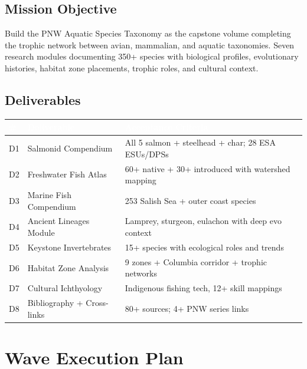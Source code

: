 \documentclass[11pt,letterpaper]{article}
\newcommand{\tableheader}[1]{\textbf{\sffamily\textcolor{white}{#1}}}
\begin{document}
\subsection{Mission Objective}
Build the PNW Aquatic Species Taxonomy as the capstone volume completing the trophic network between avian, mammalian, and aquatic taxonomies. Seven research modules documenting 350+ species with biological profiles, evolutionary histories, habitat zone placements, trophic roles, and cultural context.

\subsection{Deliverables}

\begin{center}
\begin{tabularx}{\textwidth}{C{0.5cm}L{3.5cm}X}
\toprule
{}
\tableheader{\#} & \tableheader{Deliverable} & \tableheader{Acceptance Criteria} \\
\midrule
D1 & Salmonid Compendium & All 5 salmon + steelhead + char; 28 ESA ESUs/DPSs \\
D2 & Freshwater Fish Atlas & 60+ native + 30+ introduced with watershed mapping \\
D3 & Marine Fish Compendium & 253 Salish Sea + outer coast species \\
D4 & Ancient Lineages Module & Lamprey, sturgeon, eulachon with deep evo context \\
D5 & Keystone Invertebrates & 15+ species with ecological roles and trends \\
D6 & Habitat Zone Analysis & 9 zones + Columbia corridor + trophic networks \\
D7 & Cultural Ichthyology & Indigenous fishing tech, 12+ skill mappings \\
D8 & Bibliography + Cross-links & 80+ sources; 4+ PNW series links \\
\bottomrule
\end{tabularx}
\end{center}

\section{Wave Execution Plan}
\end{document}
